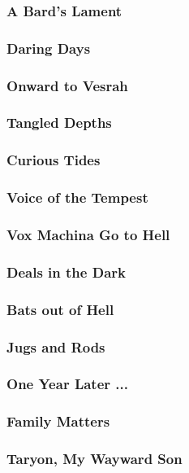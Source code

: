         \subsubsection{A Bard's Lament}
        \subsubsection{Daring Days}
        \subsubsection{Onward to Vesrah}
        \subsubsection{Tangled Depths}
        \subsubsection{Curious Tides}
        \subsubsection{Voice of the Tempest}
        \subsubsection{Vox Machina Go to Hell}
        \subsubsection{Deals in the Dark}
        \subsubsection{Bats out of Hell}
        \subsubsection{Jugs and Rods}
        \subsubsection{One Year Later ... }
        \subsubsection{Family Matters}
        \subsubsection{Taryon, My Wayward Son}
